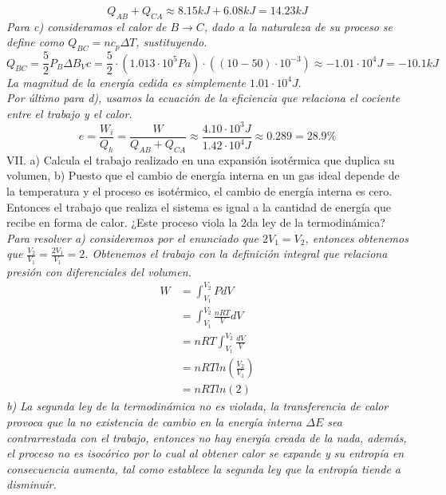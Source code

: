 \documentclass{article}
\begin{document}
\begin{equation*}
    Q_{AB} + Q_{CA} \approx 8.15kJ + 6.08 kJ = 14.23 kJ
\end{equation*}
\textit{Para c) consideramos el calor de $B \rightarrow C$, dado a la naturaleza de su proceso se define como $Q_{BC} = nc_p \Delta T$, sustituyendo.}
\begin{equation*}
    Q_{BC} = \frac{5}{2}P_B \Delta B_V c = \frac{5}{2} \cdot (1.013 \cdot 10^5 Pa) \cdot ((10-50) \cdot 10^{-3}) \approx -1.01 \cdot 10^4J = -10.1 kJ
\end{equation*}
\textit{La magnitud de la energía cedida es simplemente $1.01 \cdot 10^4J$}. \\
\textit{Por último para d), usamos la ecuación de la eficiencia que relaciona el cociente entre el trabajo y el calor.}
\begin{equation*}
    e = \frac{W_i}{Q_h} = \frac{W}{Q_{AB} + Q_{CA}} \approx \frac{4.10 \cdot 10^3 J}{1.42 \cdot 10^4 J} \approx 0.289 = 28.9 \%
\end{equation*}
VII. a) Calcula el trabajo realizado en una expansión isotérmica que duplica su volumen, b) Puesto que el cambio de energía interna en un gas ideal depende de la temperatura y el proceso es isotérmico, el cambio de energía interna es cero. Entonces el trabajo que realiza el sistema es igual a la cantidad de energía que recibe en forma de calor. ¿Este proceso viola la 2da ley de la termodinámica? \\
\textit{Para resolver a) consideremos por el enunciado que $2V_1=V_2$, entonces obtenemos que $\frac{V_2}{V_1} = \frac{2V_1}{V_1} = 2$. Obtenemos el trabajo con la definición integral que relaciona presión con diferenciales del volumen.}
\begin{align*}
    W &= \int_{V_1} ^{V_2} P dV \\
    &= \int_{V_1} ^{V_2} \frac{nRT}{V} dV \\
    &= nRT \int_{V_1} ^{V_2} \frac{dV}{V} \\
    &= nRT ln(\frac{V_2}{V_1}) \\
    &= nRT ln(2)
\end{align*}
\textit{b) La segunda ley de la termodinámica no es violada, la transferencia de calor provoca que la no existencia de cambio en la energía interna $\Delta E$ sea contrarrestada con el trabajo, entonces no hay energía creada de la nada, además, el proceso no es isocórico por lo cual al obtener calor se expande y su entropía en consecuencia aumenta, tal como establece la segunda ley que la entropía tiende a disminuir.}
\end{document}
